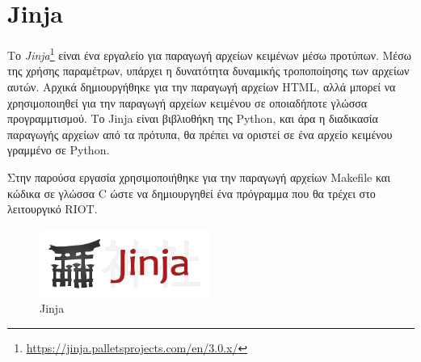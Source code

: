 \section{Jinja}
\label{sec:jinja}

Το \textit{Jinja}\footnote{\url{https://jinja.palletsprojects.com/en/3.0.x/}} είναι ένα εργαλείο για παραγωγή αρχείων κειμένων μέσω προτύπων. Μέσω της χρήσης παραμέτρων, υπάρχει η δυνατότητα δυναμικής τροποποίησης των αρχείων αυτών. Αρχικά δημιουργήθηκε για την παραγωγή αρχείων HTML, αλλά μπορεί να χρησιμοποιηθεί για την παραγωγή αρχείων κειμένου σε οποιαδήποτε γλώσσα προγραμμτισμού. Το Jinja είναι βιβλιοθήκη της Python, και άρα η διαδικασία παραγωγής αρχείων από τα πρότυπα, θα πρέπει να οριστεί σε ένα αρχείο κειμένου γραμμένο σε Python. 

Στην παρούσα εργασία χρησιμοποιήθηκε για την παραγωγή αρχείων Makefile και κώδικα σε γλώσσα C ώστε να δημιουργηθεί ένα πρόγραμμα που θα τρέχει στο λειτουργικό RIOT.

\begin{figure}[!ht]
  \centering
  \includegraphics[width=0.5\textwidth]{./images/chapter4/jinja.png}
  \caption{Jinja}
  \label{fig:jinja}
\end{figure}